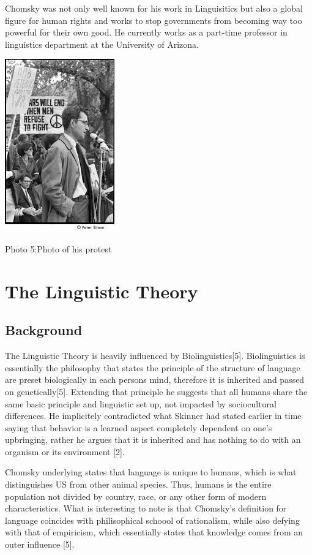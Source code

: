 \documentclass[conference]{IEEEtran}
\begin{document}
Chomsky was not only well known for his work in Linguisitics but also a global figure for human rights and works to stop governments from becoming way too powerful for their own good. He currently works as a part-time professor in linguistics department at the University of Arizona. \newline

\includegraphics[scale=.5]{resist.jpg} 

Photo 5:Photo of his protest
\section{The Linguistic Theory}

\subsection{Background}
The Linguistic Theory is heavily influenced by Biolinguistics[5]. Biolinguistics is essentially the philosophy that states the principle of the structure of language are preset biologically in each persons mind, therefore it is inherited and passed on genetically[5]. Extending that principle he suggests that all humans share the same basic principle and linguistic set up, not impacted by sociocultural differences. He implicitely contradicted what Skinner had stated earlier in time saying that behavior is a learned aspect completely dependent on one's upbringing, rather he argues that it is inherited and has nothing to do with an organism or its environment [2].

Chomsky underlying states that language is unique to humans, which is what distinguishes US from other animal species. Thus, humans is the entire population not divided by country, race, or any other form of modern characteristics. What is interesting to note is that Chomsky's definition for language coincides with philisophical schoool of rationalism, while also defying with that of empiricism, which essentially states that knowledge comes from an outer influence [5]. 
\end{document}
